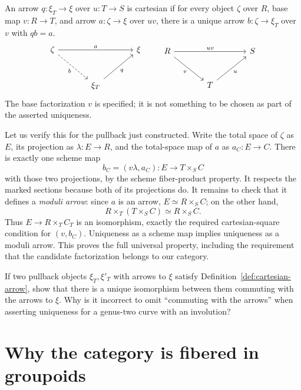 \begin{Def}\label{def:cartesian-arrow}
An arrow $q:\xi_T\to\xi$ over $u:T\to S$ is cartesian if for
every object $\zeta$ over $R$, base map $v:R\to T$, and arrow
$a:\zeta\to\xi$ over $uv$, there is a unique arrow
$b:\zeta\to\xi_T$ over $v$ with $q b=a$.
\[
\begin{tikzcd}[row sep=large,column sep=large]
\zeta\arrow[rr,"a"]\arrow[dr,dashed,"b"']&&\xi\\
&\xi_T\arrow[ur,"q"']&
\end{tikzcd}
\qquad
\begin{tikzcd}[row sep=large,column sep=large]
R\arrow[rr,"uv"]\arrow[dr,"v"']&&S\\
&T\arrow[ur,"u"']&
\end{tikzcd}
\]
The base factorization $v$ is specified; it is not something to be
chosen as part of the asserted uniqueness.
\end{Def}

Let us verify this for the pullback just constructed. Write the
total space of $\zeta$ as $E$, its projection as $\lambda:E\to R$,
and the total-space map of $a$ as $a_C:E\to C$. There is exactly
one scheme map
\[
           b_C=(v\lambda,a_C):E\longrightarrow T\times_SC
\]
with those two projections, by the scheme fiber-product property.
It respects the marked sections because both of its projections
do. It remains to check that it defines a \emph{moduli arrow}:
since $a$ is an arrow, $E\simeq R\times_SC$; on the other hand,
\[
                R\times_T(T\times_SC)\simeq R\times_SC.
\]
Thus $E\to R\times_TC_T$ is an isomorphism, exactly the required
cartesian-square condition for $(v,b_C)$. Uniqueness as a scheme
map implies uniqueness as a moduli arrow. This proves the full
universal property, including the requirement that the candidate
factorization belongs to our category.

\begin{Ej}\label{ex:cartesian-uniqueness}
If two pullback objects $\xi_T,\xi'_T$ with arrows to $\xi$ satisfy
Definition~\ref{def:cartesian-arrow}, show that there is a unique
isomorphism between them commuting with the arrows to $\xi$.
Why is it incorrect to omit ``commuting with the arrows'' when
asserting uniqueness for a genus-two curve with an involution?
\end{Ej}

\section{Why the category is fibered in groupoids}

